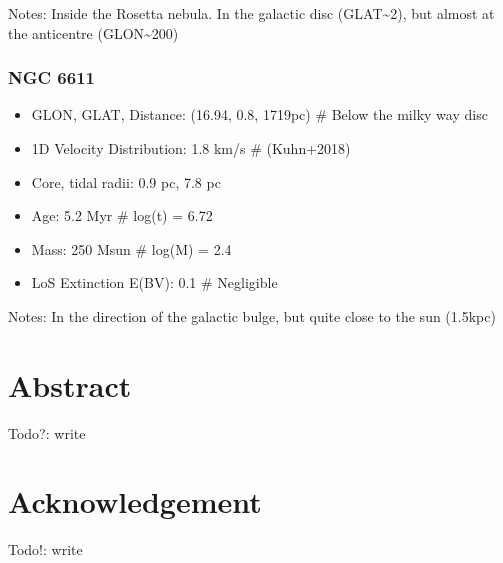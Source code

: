 \documentclass[letterpaper,10pt,english]{sphinxmanual}
\begin{document}
\sphinxAtStartPar
Notes:
Inside the Rosetta nebula.
In the galactic disc (GLAT\textasciitilde{}2), but almost at the anticentre (GLON\textasciitilde{}200)


\subsection{NGC 6611}
\label{\detokenize{Project_Overview/MilkyWayClusters:ngc-6611}}\begin{itemize}
\item {} 
\sphinxAtStartPar
GLON, GLAT, Distance: (16.94, 0.8, 1719pc)        \# Below the milky way disc

\item {} 
\sphinxAtStartPar
1D Velocity Distribution: 1.8 km/s                \# (Kuhn+2018)

\item {} 
\sphinxAtStartPar
Core, tidal radii: 0.9 pc, 7.8 pc

\item {} 
\sphinxAtStartPar
Age: 5.2 Myr                                      \# log(t) = 6.72

\item {} 
\sphinxAtStartPar
Mass: 250 Msun                                    \# log(M) = 2.4

\item {} 
\sphinxAtStartPar
LoS Extinction E(B\sphinxhyphen{}V): 0.1                        \# Negligible

\end{itemize}

\sphinxAtStartPar
Notes:
In the direction of the galactic bulge, but quite close to the sun (1.5kpc)


\chapter{Abstract}
\label{\detokenize{NBodySimulation/Abstract:abstract}}\label{\detokenize{NBodySimulation/Abstract::doc}}
\sphinxAtStartPar
Todo?: write


\chapter{Acknowledgement}
\label{\detokenize{NBodySimulation/Acknowledgement:acknowledgement}}\label{\detokenize{NBodySimulation/Acknowledgement::doc}}
\sphinxAtStartPar
Todo!: write
\end{document}
